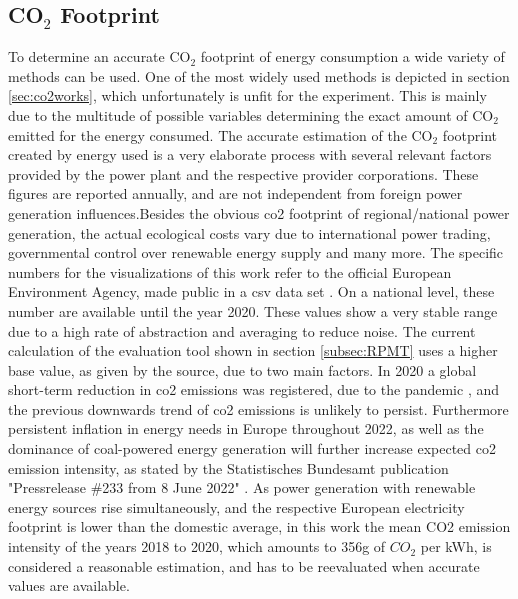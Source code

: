 \subsection{ \texorpdfstring{CO$_2$ Footprint}{CO2 Footprint}}\label{subsec:footprint}
To determine an accurate CO$_2$ footprint of energy consumption a wide variety of methods can be used. One of the most widely used methods is depicted in section \ref{sec:co2works}, which unfortunately is unfit for the experiment. This is mainly due to the multitude of possible variables determining the exact amount of CO$_2$ emitted for the energy consumed. The accurate estimation of the CO$_2$ footprint created by energy used is a very elaborate process with several relevant factors provided by the power plant and the respective provider corporations. These figures are reported annually, and are not independent from foreign power generation influences.Besides the obvious co2 footprint of regional/national power generation, the actual ecological costs vary due to international power trading, governmental control over renewable energy supply and many more. The specific numbers for the visualizations of this work refer to the official European Environment Agency, made public in a csv data set \cite{co2_footprint}. On a national level, these number are available until the year 2020. These values show a very stable range due to a high rate of abstraction and averaging to reduce noise. The current calculation of the evaluation tool shown in section \ref{subsec:RPMT} uses a higher base value, as given by the source, due to two main factors. In 2020 a global short-term reduction in co2 emissions was registered, due to the pandemic \cite{NICOLINI2022154662}, and the previous downwards trend of co2 emissions is unlikely to persist. Furthermore persistent inflation in energy needs in Europe throughout 2022, as well as the dominance of coal-powered energy generation will further increase expected co2 emission intensity, as stated by the Statistisches Bundesamt publication "Pressrelease \#233 from 8 June 2022" \cite{destatista_coal}. As power generation with renewable energy sources rise simultaneously, and the respective European electricity footprint is lower than the domestic average, in this work the mean CO2 emission intensity of the years 2018 to 2020, which amounts to 356g of $CO_2$ per kWh, is considered a reasonable estimation, and has to be reevaluated when accurate values are available.